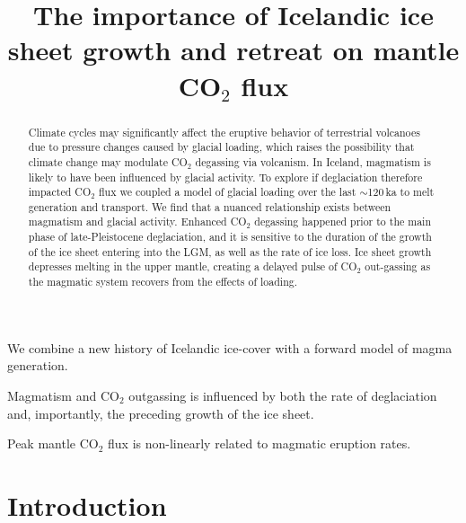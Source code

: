 \documentclass[draft,linenumbers]{agujournal2018}
\begin{document}
\title{The importance of Icelandic ice sheet growth and retreat on mantle CO$_2$ flux}





\begin{keypoints}
\item We combine a new history of Icelandic ice-cover with a forward model of magma generation.
\item Magmatism and CO$_{2}$ outgassing is influenced by both the rate of deglaciation and, importantly, the preceding growth of the ice sheet.
\item Peak mantle CO$_{2}$ flux is non-linearly related to magmatic eruption rates.
\end{keypoints}

\begin{abstract}
Climate cycles may significantly affect the eruptive behavior of terrestrial volcanoes due to pressure changes caused by glacial loading, which raises the possibility that climate change may modulate CO$_{2}$ degassing via volcanism. In Iceland, magmatism is likely to have been influenced by glacial activity. To explore if deglaciation therefore impacted CO$_{2}$ flux we coupled a model of glacial loading over the last $\sim$120\,ka to melt generation and transport. We find that a nuanced relationship exists between magmatism and glacial activity. Enhanced CO$_{2}$ degassing happened prior to the main phase of late-Pleistocene deglaciation, and it is sensitive to the duration of the growth of the ice sheet entering into the LGM, as well as the rate of ice loss. Ice sheet growth depresses melting in the upper mantle, creating a delayed pulse of CO$_{2}$ out-gassing as the magmatic system recovers from the effects of loading.
\end{abstract}

\section{Introduction}
\end{document}
